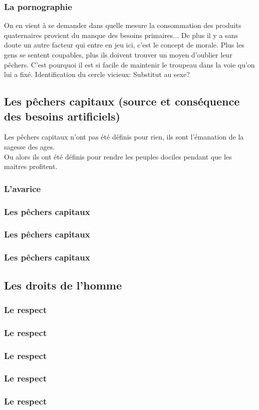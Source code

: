 \documentclass[11pt]{article} %
\begin{document}
\subsubsection{La pornographie}

On en vient à se demander dans quelle mesure la consommation des produits quaternaires provient du manque des besoins primaires...
De plus il y a sans doute un autre facteur qui entre en jeu ici, c'est le concept de morale. Plus les gens se sentent coupables, plus ils doivent trouver un moyen d'oublier leur pêchers. C'est pourquoi il est si facile de maintenir le troupeau dans la voie qu'on lui a fixé.
Identification du cercle vicieux:
Substitut au sexe? 

\subsection{Les pêchers capitaux (source et conséquence des besoins artificiels)}
Les pêchers capitaux n'ont pas été définis pour rien, ils sont l'émanation de la sagesse des ages.\\
Ou alors ils ont été définis pour rendre les peuples dociles pendant que les maitres profitent.\\
\subsubsection{L'avarice}
\subsubsection{Les pêchers capitaux}
\subsubsection{Les pêchers capitaux}
\subsubsection{Les pêchers capitaux}

\subsection{Les droits de l'homme}
\subsubsection{Le respect}
\subsubsection{Le respect}
\subsubsection{Le respect}
\subsubsection{Le respect}
\subsubsection{Le respect}
\end{document}
